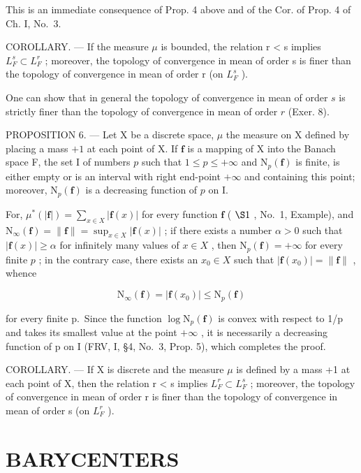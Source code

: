 This is an immediate consequence of Prop. 4 above and of the Cor. of Prop. 4 of Ch. I, No.~3.

COROLLARY. --- If the measure \(\mu\) is bounded, the relation r < s implies \(L_{F}^{s} \subset L_{F}^{r}\) ; moreover, the topology of convergence in mean of order s is finer than the topology of convergence in mean of order r (on \(L_{F}^{s}\) ).

One can show that in general the topology of convergence in mean of order \(s\) is strictly finer than the topology of convergence in mean of order \(r\) (Exer. 8).

PROPOSITION 6. --- Let X be a discrete space, \(\mu\) the measure on X defined by placing a mass \(+1\) at each point of X. If \(\mathbf{f}\) is a mapping of X into the Banach space F, the set I of numbers \(p\) such that \(1 \leqslant p \leqslant +\infty\) and \(\mathrm{N}_p(\mathbf{f})\) is finite, is either empty or is an interval with right end-point \(+\infty\) and containing this point; moreover, \(\mathrm{N}_p(\mathbf{f})\) is a decreasing function of \(p\) on I.

For, \(\mu^{*}(|\mathbf{f}|) = \sum_{x\in X}|\mathbf{f}(x)|\) for every function \(\mathbf{f}\) ( \(\S 1\) , No.~1, Example), and \(\mathrm{N}_{\infty}(\mathbf{f}) = \| \mathbf{f}\| = \sup_{x\in X}|\mathbf{f}(x)|\) ; if there exists a number \(\alpha >0\) such that \(|\mathbf{f}(x)|\geqslant \alpha\) for infinitely many values of \(x\in X\) , then \(\mathrm{N}_p(\mathbf{f}) = +\infty\) for every finite \(p\) ; in the contrary case, there exists an \(x_0\in X\) such that \(|\mathbf{f}(x_0)| = \| \mathbf{f}\|\) , whence

\[
\mathrm{N} _ {\infty} (\mathbf {f}) = | \mathbf {f} (x _ {0}) | \leqslant \mathrm{N} _ {p} (\mathbf {f})
\]

for every finite p.~Since the function \(\log\mathrm{N}_{p}(\mathbf{f})\) is convex with respect to 1/p and takes its smallest value at the point \(+\infty\) , it is necessarily a decreasing function of p on I (FRV, I, §4, No.~3, Prop. 5), which completes the proof.

COROLLARY. --- If X is discrete and the measure \(\mu\) is defined by a mass +1 at each point of X, then the relation r < s implies \(L_{F}^{r} \subset L_{F}^{s}\) ; moreover, the topology of convergence in mean of order r is finer than the topology of convergence in mean of order s (on \(L_{F}^{r}\) ).

\section{BARYCENTERS}

